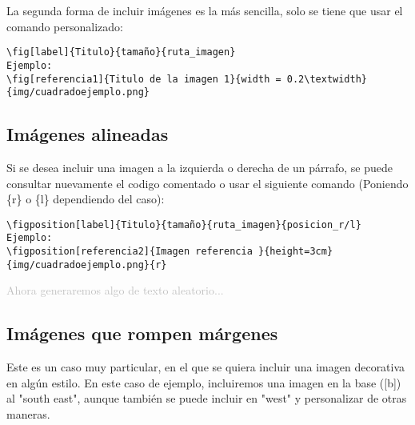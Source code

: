 \documentclass[../main.tex]{subfiles}
\begin{document}
La segunda forma de incluir imágenes es la más sencilla, solo se tiene que usar el comando personalizado:
\begin{verbatim} 
\fig[label]{Titulo}{tamaño}{ruta_imagen}
Ejemplo:
\fig[referencia1]{Titulo de la imagen 1}{width = 0.2\textwidth}{img/cuadradoejemplo.png}
\end{verbatim}



\subsection{Imágenes alineadas}
Si se desea incluir una imagen a la izquierda o derecha de un párrafo, se puede consultar nuevamente el codigo comentado o usar el siguiente comando (Poniendo \{r\} o \{l\} dependiendo del caso):
\begin{verbatim} 
\figposition[label]{Titulo}{tamaño}{ruta_imagen}{posicion_r/l}
Ejemplo:
\figposition[referencia2]{Imagen referencia }{height=3cm}{img/cuadradoejemplo.png}{r}
\end{verbatim}




\textcolor{silver}{
    Ahora generaremos algo de texto aleatorio...
    \lipsum[2]
}

\subsection{Imágenes que rompen márgenes}

Este es un caso muy particular, en el que se quiera incluir una imagen decorativa en algún estilo. En este caso de ejemplo, incluiremos una imagen en la base ([b]) al "south east", aunque también se puede incluir en "west" y personalizar de otras maneras.
\end{document}

